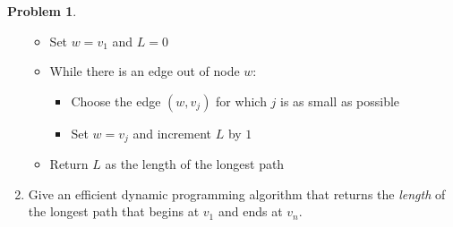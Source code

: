 \documentclass[12pt]{article}
\theoremstyle{definition}
\newtheorem{question}{Problem}
\begin{document}
\begin{question}
\begin{enumerate}[label=(\alph*)]
    \begin{itemize}[noitemsep, nolistsep]
      \item Set $w = v_1$ and $L =0$ 
      \item While there is an edge out of node $w$:
        \begin{itemize}
          \item Choose the edge $(w, v_j)$ for which $j$ is as small as possible 
          \item Set $w = v_j$ and increment $L$ by $1$
        \end{itemize}
      \item Return $L$ as the length of the longest path 
    \end{itemize}




\item Give an efficient dynamic programming algorithm that returns the {\em length} of the longest path that
begins at $v_1$ and ends at $v_n$.

\end{enumerate}
\end{question}
\end{document}
